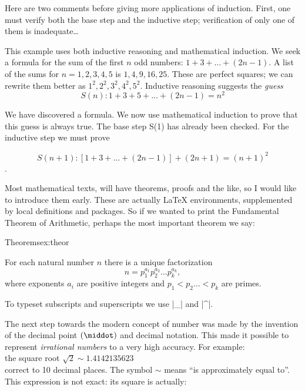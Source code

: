Here are two comments before giving more applications of induction. First, one must verify both the base step and the inductive step; verification of only one of them is inadequate\ldots




\begin{Exercise}
\upshape
This example uses both inductive reasoning and mathematical induction. We seek a formula for the sum of the first $n$ odd numbers: $1 + 3 + \dots+(2n-1)$. A list of the sums for $n =1,2,3,4,5$ is $1,4,9,16,25$. These are perfect squares; we can rewrite them better as $1^2,2^2,3^2,4^2,5^2$. Inductive reasoning suggests the \emph{guess}
\[ S(n): 1 + 3 +5 +\dots+(2n-1)=n^2\]

We have discovered a formula. We now use mathematical induction to prove that this guess is always true. The base step S(1) has already been checked. For the inductive step we must prove 

\[S(n+1): [1+3+\dots+(2n-1)] + (2n+1) = (n+1)^2 \].
\end{Exercise}


Most mathematical texts, will have theorems, proofs and the like, so I would like to introduce them early. These are actually LaTeX environments, supplemented by local definitions and packages.
So if we wanted to print the Fundamental Theorem of Arithmetic, perhaps the most important theorem we say:

\begin{texexample}{Theorems}{ex:theor}
\begin{theorem} For each natural
number $n$ there is a unique factorization
\[n = p_1^{a_1} p_2^{a_2}\ldots p_k^{a_k},\]
where exponents $a_i$ are positive integers and $p_1<p_2\ldots<p_k$ are primes.
\end{theorem}
\end{texexample}

To typeset subscripts and superscripts we use |_| and |^|.

The next step towards the modern concept of number was made by the invention of the decimal point $(\middot)$ and decimal notation. This made it possible to represent \textit{irrational numbers} to a very high accuracy. For example:\\
the square root $\sqrt{2}\sim 1.4142135623$\\[0.3ex]
correct to 10 decimal places. The symbol $\sim$ means \enquote{is approximately equal to}. This expression is not exact: its square is actually:\\[0.3ex]

